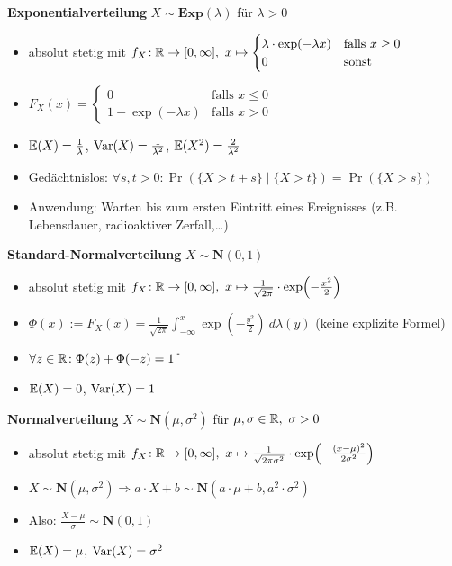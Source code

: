 \textbf{Exponentialverteilung} $X\sim\mathbf{Exp}(\lambda)$ für $\lambda > 0$
\begin{itemize}
\item absolut stetig mit
  $f_X\!: \mathbb{R} \to [0,\infty],\ x \mapsto \begin{cases}
  \lambda \cdot \exp(-\lambda x) & \text{falls } x \geq 0	\\
  0                              & \text{sonst }
  \end{cases}$

\item
  $F_X(x) = \begin{cases}
  0                    & \text{falls } x \leq 0  \\
  1 - \exp(-\lambda x) & \text{falls } x > 0
  \end{cases}$

\item $\mathbb{E}(X) = \frac{1}{\lambda}$, $\operatorname{Var}(X) = \frac{1}{\lambda^2}$,
  $\mathbb{E}(X^2) = \frac{2}{\lambda^2}$

\item Gedächtnislos: $\forall s,t>0\!: \Pr(\{X>t+s\} \mid \{X>t\}) = \Pr(\{X>s\})$

\item Anwendung: Warten bis zum ersten Eintritt eines Ereignisses
  (z.B. Lebensdauer, radioaktiver Zerfall,\ldots)
\end{itemize}

\textbf{Standard-Normalverteilung} $X\sim\mathbf{N}(0,1)$
\begin{itemize}
\item absolut stetig mit $f_X\!: \R \to [0,\infty],\
  x \mapsto \frac{1}{\sqrt{2\pi}} \cdot \exp\left(-\frac{x^2}{2}\right)$

\item $\Phi(x) := F_X(x)=
  \frac{1}{\sqrt{2\pi}} \int_{-\infty}^{x} \exp\left(-\frac{y^2}{2}\right)~d\lambda(y)$
  (keine explizite Formel)

\item $\forall z\in\mathbb{R}\!: \Phi(z) + \Phi(-z) = 1$ \U

\item $\mathbb{E}(X) = 0$, $\operatorname{Var}(X) = 1$

\end{itemize}

\textbf{Normalverteilung} $X\sim\mathbf{N}(\mu,\sigma^2)$ für
  $\mu,\sigma\in\mathbb{R},\ \sigma > 0$
\begin{itemize}
\item absolut stetig mit $f_X\!: \R \to [0,\infty],\
  x \mapsto \frac{1}{\sqrt{2\pi\sigma^2}} \cdot \exp\left(-\frac{(x-\mu)^2}{2\sigma^2}\right)$

\item $X\sim\mathbf{N}(\mu,\sigma^2)
  \Rightarrow a \cdot X + b \sim\mathbf{N}(a\cdot\mu+b,a^2\cdot\sigma^2)$

\item Also: $\frac{X-\mu}{\sigma} \sim \mathbf{N}(0,1)$

\item $\mathbb{E}(X) = \mu$, $\operatorname{Var}(X) = \sigma^2$
\end{itemize}

